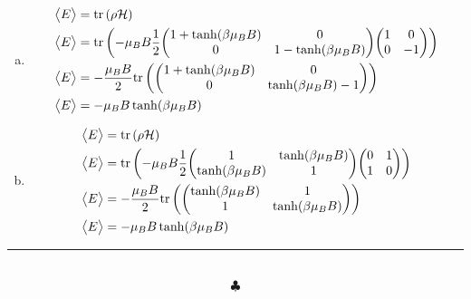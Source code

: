 \documentclass[]{article}
\begin{document}
\begin{enumerate}[1)]
\begin{enumerate}[a)]
\begin{enumerate}[a)]
\item
\begin{equation}
\begin{split}
\big< E \big> &= \text{tr}\left( \rho\mathcal{H}\right) \\
\big< E \big> &= \text{tr}\left(-\mu_BB \frac{1}{2}\mqty( 1 +   \tanh(\beta\mu_BB) & 0 \\ 0 & 1 -  \tanh(\beta\mu_BB)  )\mqty(1 & 0\\ 0 & -1)\right) \\
\big< E \big> &= - \frac{\mu_BB}{2}\text{tr}\left(   \mqty( 1 +   \tanh(\beta\mu_BB) & 0 \\ 0 &   \tanh(\beta\mu_BB) -1 )\right) \\
\big< E \big> &= - \mu_BB\tanh(\beta\mu_BB)
\end{split}
\end{equation}

\item
\begin{equation}
\begin{split}
\big< E \big> &= \text{tr}\left( \rho\mathcal{H}\right) \\
\big< E \big> &= \text{tr}\left(-\mu_BB \frac{1}{2}\mqty( 1 &  \tanh(\beta\mu_BB)  \\ \tanh(\beta\mu_BB)   & 1   )\mqty(0 & 1\\ 1 & 0)\right) \\
\big< E \big> &= - \frac{\mu_BB}{2}\text{tr}\left(   \mqty(  \tanh(\beta\mu_BB) & 1 \\ 1 &   \tanh(\beta\mu_BB)  )\right) \\
\big< E \big> &= - \mu_BB\tanh(\beta\mu_BB)
\end{split}
\end{equation}

\end{enumerate}
\end{enumerate}

\end{enumerate}
\noindent\rule{15cm}{0.4pt} \\
$$\clubsuit$$
\end{document}

